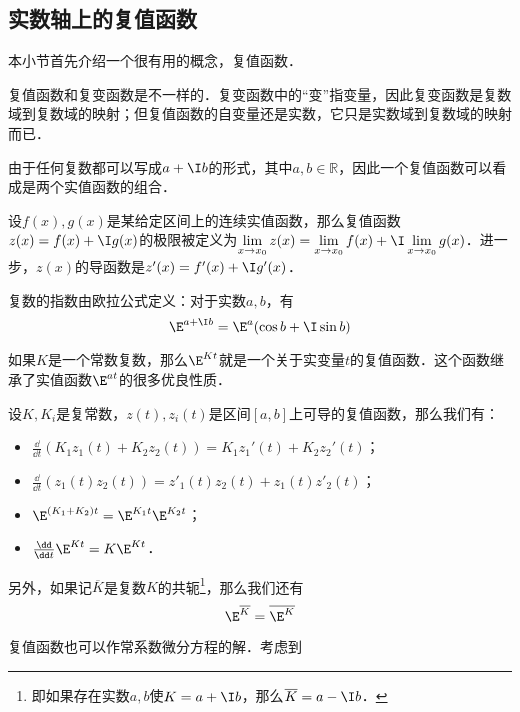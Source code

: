 

\subsection{实数轴上的复值函数}

本小节首先介绍一个很有用的概念，复值函数．

复值函数和复变函数是不一样的．复变函数中的“变”指变量，因此复变函数是复数域到复数域的映射；但复值函数的自变量还是实数，它只是实数域到复数域的映射而已．

由于任何复数都可以写成$a+\I b$的形式，其中$a, b\in\mathbb{R}$，因此一个复值函数可以看成是两个实值函数的组合．

设$f(x), g(x)$是某给定区间上的连续实值函数，那么复值函数$z(x)=f(x)+\I g(x)$的极限被定义为$\lim\limits_{x\to x_0}z(x)=\lim\limits_{x\to x_0}f(x)+\I\lim\limits_{x\to x_0}g(x)$．进一步，$z(x)$的导函数是$z'(x)=f'(x)+\I g'(x)$．

复数的指数由欧拉公式定义：对于实数$a, b$，有
\begin{equation}
\E^{a+\I b}=\E^a(\cos b+\I\sin b)
\end{equation}

如果$K$是一个常数复数，那么$\E^{Kt}$就是一个关于实变量$t$的复值函数．这个函数继承了实值函数$\E^{at}$的很多优良性质．

\begin{theorem}{}
设$K, K_i$是复常数，$z(t), z_i(t)$是区间$[a, b]$上可导的复值函数，那么我们有：
\begin{itemize}
\item $\frac{\dd }{\dd t}(K_1z_1(t)+K_2z_2(t))=K_1z_1'(t)+K_2z_2'(t)$；
\item $\frac{\dd}{\dd t}(z_1(t)z_2(t))=z'_1(t)z_2(t)+z_1(t)z'_2(t)$；
\item $\E^{(K_1+K_2)t}=\E^{K_1t}\E^{K_2t}$；
\item $\frac{\dd }{\dd t}\E^{Kt}=K\E^{Kt}$．
\end{itemize}
\end{theorem}

另外，如果记$\overline{K}$是复数$K$的共轭\footnote{即如果存在实数$a, b$使$K=a+\I b$，那么$\overline{K}=a-\I b$．}，那么我们还有
\begin{equation}
\E^{\overline{K}}=\overline{\E^K}
\end{equation}

复值函数也可以作常系数微分方程的解．考虑到






















